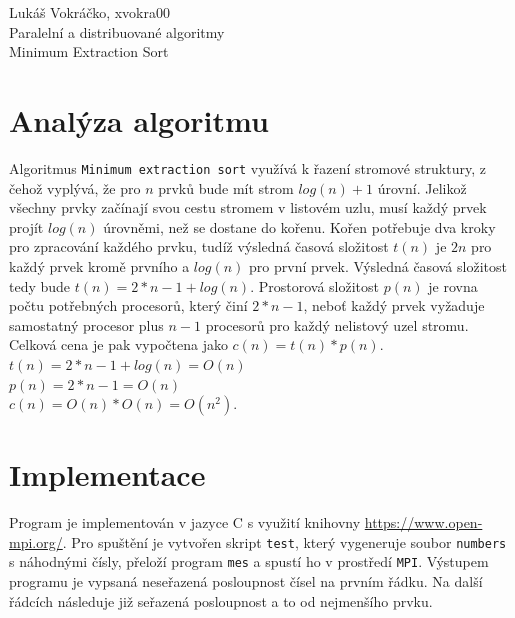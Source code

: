 \documentclass[12pt,a4paper,titlepage,final]{article}
\begin{document}
\newpage

\def\name{Lukáš Vokráčko}
\def\login{xvokra00}
\def\subject{Paralelní a distribuované algoritmy}
\def\project{Minimum Extraction Sort}


{
	\pagestyle{empty}
	
	\tableofcontents
	\newpage
	\pagestyle{plain}
}
{
	\pagestyle{plain}
	\hfill \name, \login \\
	\vspace*{5px}
	{\LARGE \subject}  \\
	{\LARGE \project}  \\
}

\setcounter{page}{1}

\section{Analýza algoritmu}
Algoritmus \texttt{Minimum extraction sort} využívá k řazení stromové struktury, z čehož vyplývá, že pro $n$ prvků bude mít strom 
$log(n) + 1$ úrovní. Jelikož všechny prvky začínají svou cestu stromem v listovém uzlu, musí každý prvek projít $log(n)$ úrovněmi, než se dostane do kořenu.
Kořen potřebuje dva kroky pro zpracování každého prvku, tudíž výsledná časová složitost $t(n)$ je $2n$ pro každý prvek kromě prvního a $log(n)$ pro první prvek.
Výsledná časová složitost tedy bude $t(n) = 2*n - 1 + log(n)$. Prostorová složitost $p(n)$ je  rovna počtu potřebných procesorů, který činí $2*n - 1$, neboť každý prvek vyžaduje samostatný procesor plus $n-1$ procesorů pro každý nelistový uzel stromu. Celková cena je pak vypočtena jako $c(n) = t(n) * p(n)$.\\
$t(n) = 2*n-1+log(n) = O(n)$ \\
$p(n) = 2*n-1 = O(n)$ \\
$c(n) = O(n)*O(n)= O(n^2) $.

\section{Implementace}
Program je implementován v jazyce C s využití knihovny \url{https://www.open-mpi.org/}.
Pro spuštění je vytvořen skript \texttt{test}, který vygeneruje soubor \texttt{numbers} s náhodnými čísly,
přeloží program \texttt{mes} a spustí ho v prostředí \texttt{MPI}. Výstupem programu je vypsaná neseřazená posloupnost čísel na prvním řádku.
Na další řádcích následuje již seřazená posloupnost a to od nejmenšího prvku.
\end{document}
